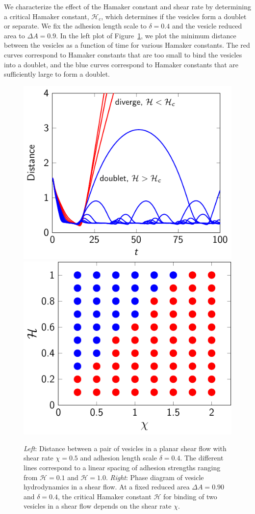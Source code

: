 \documentclass[prf,superscriptaddress,showpacs]{revtex4-1}
\begin{document}
We characterize the effect of the Hamaker constant and shear rate by
determining a critical Hamaker constant, $\mathcal{H}_c$, which
determines if the vesicles form a doublet or separate.  We fix the
adhesion length scale to $\delta = 0.4$ and the vesicle reduced area to
$\Delta A = 0.9$.  In the left plot of
Figure~\ref{fig:sflow_phase_diagram}, we plot the minimum distance
between the vesicles as a function of time for various Hamaker
constants.  The red curves correspond to Hamaker constants that are too
small to bind the vesicles into a doublet, and the blue curves
correspond to Hamaker constants that are sufficiently large to form a
doublet.

\begin{figure}
  \includegraphics[height=0.35\textwidth]{figs/shear_adR4em1Chi1e0_ra-090.pdf}
  \includegraphics[height=0.35\textwidth]{figs/shear_adR4em1_ra090_phaseDiagram.pdf}
  \caption{{\em Left}: Distance between a pair of vesicles in a planar
  shear flow with shear rate $\chi=0.5$ and adhesion length scale
  $\delta = 0.4$.   The different lines correspond to a linear spacing
  of adhesion strengths ranging from $\mathcal{H}=0.1$ and
  $\mathcal{H}=1.0$.  {\em Right}: Phase diagram of vesicle
  hydrodynamics in a shear flow.  At a fixed reduced area $\Delta
  A=0.90$ and $\delta = 0.4$,  the critical Hamaker constant
  $\mathcal{H}$ for binding of two vesicles in a shear flow depends on
  the shear rate $\chi$.
\label{fig:sflow_phase_diagram}}
\end{figure}
\end{document}
